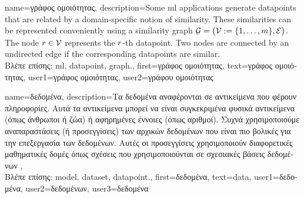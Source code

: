  {name={\foreignlanguage{greek}{γράφος ομοιότητας}}, 
 	description={Some \gls{ml} applications generate \gls{datapoint}s that 
 		are related by a domain-specific notion of similarity. These similarities can be 
 		represented conveniently using a similarity \gls{graph} $\mathcal{G} = \big(\mathcal{V} := \{1, \ldots, m\},\mathcal{E}\big)$. 
 		The node $r \in \mathcal{V}$ represents the $r$-th \gls{datapoint}. Two 
 		nodes are connected by an undirected edge if the corresponding \gls{datapoint}s are similar.\\
		\foreignlanguage{greek}{Βλέπε επίσης:} \gls{ml}, \gls{datapoint}, \gls{graph}.},
 	first={\foreignlanguage{greek}{γράφος ομοιότητας}},
	text={\foreignlanguage{greek}{γράφος ομοιότητας}},
	user1={\foreignlanguage{greek}{γράφος ομοιότητας}}, %
  	user2={\foreignlanguage{greek}{γράφου ομοιότητας}} %
}

{name={\foreignlanguage{greek}{δεδομένα}},
	 description={\foreignlanguage{greek}{Τα δεδομένα αναφέρονται σε αντικείμενα που φέρουν} 
	 	\foreignlanguage{greek}{πληροφορίες. Αυτά τα αντικείμενα μπορεί να είναι συγκεκριμένα φυσικά αντικείμενα 
		(όπως άνθρωποι ή ζώα) ή αφηρημένες έννοιες (όπως αριθμοί).  Συχνά χρησιμοποιούμε αναπαραστάσεις (ή 
	 	προσεγγίσεις) των αρχικών δεδομένων που είναι πιο βολικές για την επεξεργασία των δεδομένων. 
		Αυτές οι προσεγγίσεις χρησιμοποιούν διαφορετικές μαθηματικές δομές όπως σχέσεις που χρησιμοποιούνται 
		σε σχεσιακές βάσεις δεδομένων} \cite{codd1970relational}, \cite{silberschatz2019database}\\
		\foreignlanguage{greek}{Βλέπε επίσης:} \gls{model}, \gls{dataset}, \gls{datapoint}.}, 
	first={\foreignlanguage{greek}{δεδομένα}},
	text={data},
	user1={\foreignlanguage{greek}{δεδομένα}}, %
  	user2={\foreignlanguage{greek}{δεδομένων}}, %
	user3={\foreignlanguage{greek}{δεδομένα}} %
}

